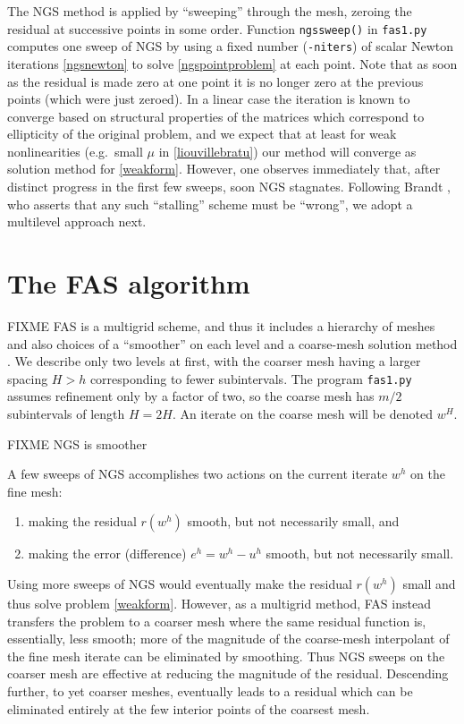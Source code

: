 \documentclass[letterpaper,final,12pt,reqno]{amsart}
\begin{document}
The NGS method is applied by ``sweeping'' through the mesh, zeroing the residual at successive points in some order.  Function \texttt{ngssweep()} in \texttt{fas1.py} computes one sweep of NGS by using a fixed number (\texttt{-niters}) of scalar Newton iterations \eqref{ngsnewton} to solve \eqref{ngspointproblem} at each point.  Note that as soon as the residual is made zero at one point it is no longer zero at the previous points (which were just zeroed).  In a linear case the iteration is known to converge based on structural properties of the matrices \cite[for example]{Greenbaum1997} which correspond to ellipticity of the original problem, and we expect that at least for weak nonlinearities (e.g.~small $\mu$ in \eqref{liouvillebratu}) our method will converge as solution method for \eqref{weakform}.  However, one observes immediately that, after distinct progress in the first few sweeps, soon NGS stagnates.  Following Brandt \cite{Brandt1977}, who asserts that any such ``stalling'' scheme must be ``wrong'', we adopt a multilevel approach next.


\section{The FAS algorithm}

FIXME FAS is a multigrid scheme, and thus it includes a hierarchy of meshes and also choices of a ``smoother'' on each level and a coarse-mesh solution method \cite{Briggsetal2000}.  We describe only two levels at first, with the coarser mesh having a larger spacing $H>h$ corresponding to fewer subintervals.  The program \texttt{fas1.py} assumes refinement only by a factor of two, so the coarse mesh has $m/2$ subintervals of length $H=2H$.  An iterate on the coarse mesh will be denoted $w^H$.

FIXME NGS is smoother

A few sweeps of NGS accomplishes two actions on the current iterate $w^h$ on the fine mesh:
\renewcommand{\labelenumi}{\emph{\roman{enumi})}}
\begin{enumerate}
\item making the residual $r(w^h)$ smooth, but not necessarily small, and
\item making the error (difference) $e^h = w^h - u^h$ smooth, but not necessarily small.
\end{enumerate}
Using more sweeps of NGS would eventually make the residual $r(w^h)$ small and thus solve problem \eqref{weakform}.  However, as a multigrid method, FAS instead transfers the problem to a coarser mesh where the same residual function is, essentially, less smooth; more of the magnitude of the coarse-mesh interpolant of the fine mesh iterate can be eliminated by smoothing.  Thus NGS sweeps on the coarser mesh are effective at reducing the magnitude of the residual.  Descending further, to yet coarser meshes, eventually leads to a residual which can be eliminated entirely at the few interior points of the coarsest mesh.
\end{document}
